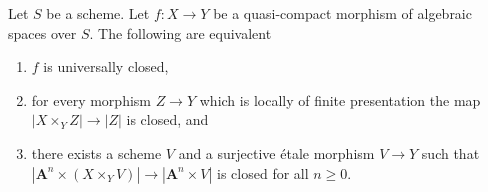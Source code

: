 \begin{lemma}
\label{lemma-test-universally-closed}
Let $S$ be a scheme.
Let $f : X \to Y$ be a quasi-compact morphism of algebraic spaces over $S$.
The following are equivalent
\begin{enumerate}
\item $f$ is universally closed,
\item for every morphism $Z \to Y$ which is locally of finite presentation
the map $|X \times_Y Z| \to |Z|$ is closed, and
\item there exists a scheme $V$ and a surjective \'etale morphism $V \to Y$
such that $|\mathbf{A}^n \times (X \times_Y V)| \to |\mathbf{A}^n \times V|$
is closed for all $n \geq 0$.
\end{enumerate}
\end{lemma}

